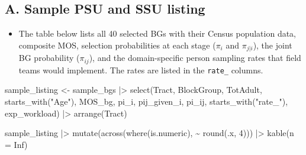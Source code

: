 \documentclass[
  11pt,
]{article}
\newenvironment{Shaded}{\begin{snugshade}}{\end{snugshade}}
\newcommand{\AttributeTok}[1]{\textcolor[rgb]{0.40,0.45,0.13}{#1}}
\newcommand{\ConstantTok}[1]{\textcolor[rgb]{0.56,0.35,0.01}{#1}}
\newcommand{\DecValTok}[1]{\textcolor[rgb]{0.68,0.00,0.00}{#1}}
\newcommand{\FunctionTok}[1]{\textcolor[rgb]{0.28,0.35,0.67}{#1}}
\newcommand{\NormalTok}[1]{\textcolor[rgb]{0.00,0.23,0.31}{#1}}
\newcommand{\OtherTok}[1]{\textcolor[rgb]{0.00,0.23,0.31}{#1}}
\newcommand{\SpecialCharTok}[1]{\textcolor[rgb]{0.37,0.37,0.37}{#1}}
\newcommand{\StringTok}[1]{\textcolor[rgb]{0.13,0.47,0.30}{#1}}
\providecommand{\tightlist}{%
  \setlength{\itemsep}{0pt}\setlength{\parskip}{0pt}}\usepackage{longtable,booktabs,array}
\begin{document}
\subsection{A. Sample PSU and SSU
listing}\label{a.-sample-psu-and-ssu-listing}

\begin{itemize}
\tightlist
\item
  The table below lists all 40 selected BGs with their Census population
  data, composite MOS, selection probabilities at each stage (\(\pi_i\)
  and \(\pi_{j|i}\)), the joint BG probability (\(\pi_{ij}\)), and the
  domain-specific person sampling rates that field teams would
  implement. The rates are listed in the \texttt{rate\_} columns.
\end{itemize}

\begin{Shaded}
\begin{Highlighting}[]
\NormalTok{sample\_listing }\OtherTok{\textless{}{-}}\NormalTok{ sample\_bgs }\SpecialCharTok{|\textgreater{}}
  \FunctionTok{select}\NormalTok{(Tract, BlockGroup, TotAdult, }\FunctionTok{starts\_with}\NormalTok{(}\StringTok{"Age"}\NormalTok{),}
\NormalTok{         MOS\_bg, pi\_i, pij\_given\_i, pi\_ij,}
         \FunctionTok{starts\_with}\NormalTok{(}\StringTok{"rate\_"}\NormalTok{), exp\_workload) }\SpecialCharTok{|\textgreater{}}
  \FunctionTok{arrange}\NormalTok{(Tract)}

\NormalTok{sample\_listing }\SpecialCharTok{|\textgreater{}}
  \FunctionTok{mutate}\NormalTok{(}\FunctionTok{across}\NormalTok{(}\FunctionTok{where}\NormalTok{(is.numeric), }\SpecialCharTok{\textasciitilde{}} \FunctionTok{round}\NormalTok{(.x, }\DecValTok{4}\NormalTok{))) }\SpecialCharTok{|\textgreater{}}
  \FunctionTok{kable}\NormalTok{(}\AttributeTok{n =} \ConstantTok{Inf}\NormalTok{)}
\end{Highlighting}
\end{Shaded}
\end{document}
